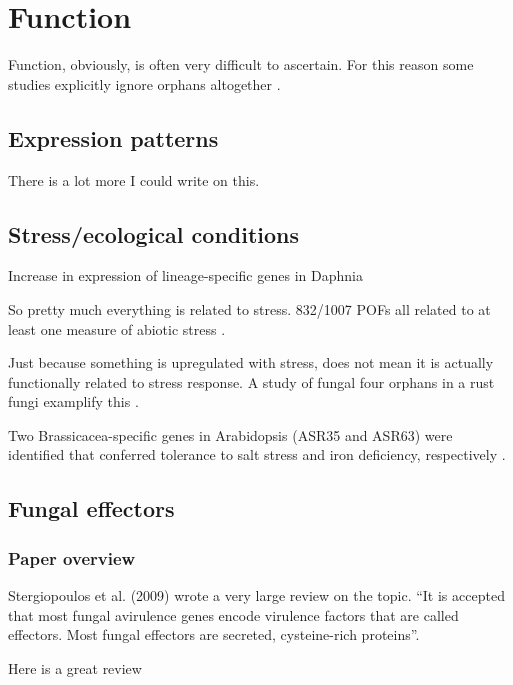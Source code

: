 \section{Function}

Function, obviously, is often very difficult to ascertain. For this reason some
studies explicitly ignore orphans altogether \cite{krehenwinkel_eco-genomic_2015}.

\subsection{Expression patterns}

   There is a lot more I could write on this. 

\subsection{Stress/ecological conditions}
   Increase in expression of lineage-specific genes in Daphnia
   \cite{voolstra_rapid_2011}

   So pretty much everything is related to stress. 832/1007 POFs all
   related to at least one measure of abiotic stress
   \cite{luhua_linking_2013}.

   Just because something is upregulated with stress, does not mean it is
   actually functionally related to stress response. A study of fungal four
   orphans in a rust fungi examplify this \cite{sadat_analysis_2014}.

   Two Brassicacea-specific genes in Arabidopsis (ASR35 and ASR63) were
   identified that conferred tolerance to salt stress and iron deficiency,
   respectively \cite{swamidatta_functional_2015}. 

\subsection{Fungal effectors}

    \subsubsection{Paper overview}

    Stergiopoulos et al. (2009) \cite{stergiopoulos_fungal_2009} wrote a very
    large review on the  topic. ``It is accepted that most fungal avirulence
    genes encode virulence factors that are called effectors. Most fungal
    effectors are secreted, cysteine-rich proteins''.

    Here is a great review \cite{de_jonge_how_2011}

